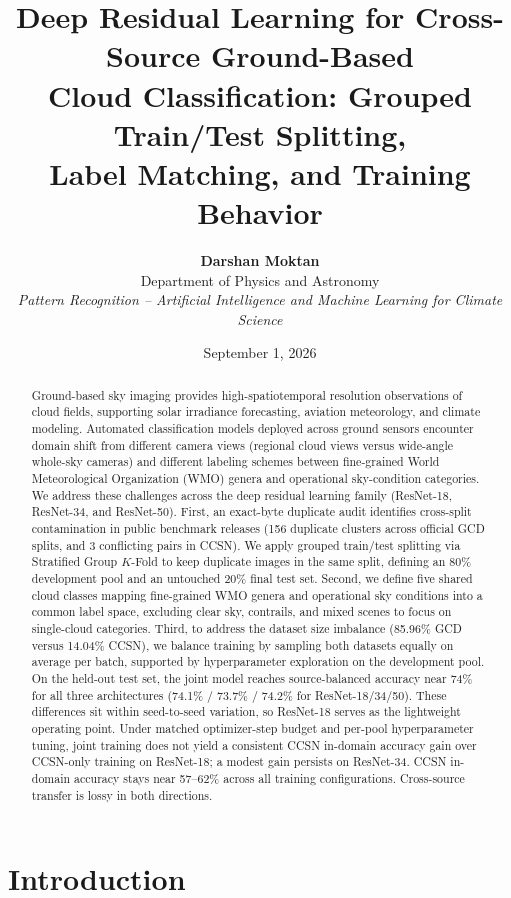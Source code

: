\documentclass[11pt,a4paper]{article}
\title{\textbf{Deep Residual Learning for Cross-Source Ground-Based\\Cloud Classification: Grouped Train/Test Splitting,\\Label Matching, and Training Behavior}}
\author{
    \textbf{Darshan Moktan} \\
    Department of Physics and Astronomy \\
    \textit{Pattern Recognition -- Artificial Intelligence and Machine Learning for Climate Science}
}
\date{September 1, 2026}
\begin{document}
\maketitle

\begin{abstract}
Ground-based sky imaging provides high-spatiotemporal resolution observations of cloud fields, supporting solar irradiance forecasting, aviation meteorology, and climate modeling. Automated classification models deployed across ground sensors encounter domain shift from different camera views (regional cloud views versus wide-angle whole-sky cameras) and different labeling schemes between fine-grained World Meteorological Organization (WMO) genera and operational sky-condition categories. We address these challenges across the deep residual learning family (ResNet-18, ResNet-34, and ResNet-50). First, an exact-byte duplicate audit identifies cross-split contamination in public benchmark releases (156 duplicate clusters across official GCD splits, and 3 conflicting pairs in CCSN). We apply grouped train/test splitting via Stratified Group $K$-Fold to keep duplicate images in the same split, defining an 80\% development pool and an untouched 20\% final test set. Second, we define five shared cloud classes mapping fine-grained WMO genera and operational sky conditions into a common label space, excluding clear sky, contrails, and mixed scenes to focus on single-cloud categories. Third, to address the dataset size imbalance (85.96\% GCD versus 14.04\% CCSN), we balance training by sampling both datasets equally on average per batch, supported by hyperparameter exploration on the development pool. On the held-out test set, the joint model reaches source-balanced accuracy near 74\% for all three architectures (74.1\% / 73.7\% / 74.2\% for ResNet-18/34/50). These differences sit within seed-to-seed variation, so ResNet-18 serves as the lightweight operating point. Under matched optimizer-step budget and per-pool hyperparameter tuning, joint training does not yield a consistent CCSN in-domain accuracy gain over CCSN-only training on ResNet-18; a modest gain persists on ResNet-34. CCSN in-domain accuracy stays near 57--62\% across all training configurations. Cross-source transfer is lossy in both directions.
\end{abstract}

\section{Introduction}
\label{sec:introduction}
\end{document}
